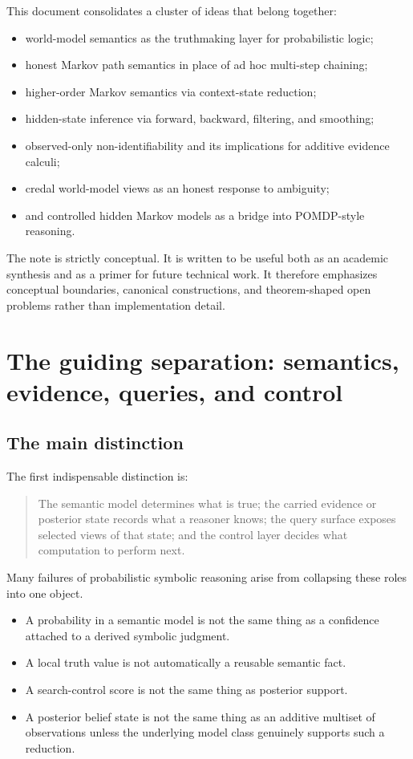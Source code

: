 \documentclass[11pt]{article}
\begin{document}
This document consolidates a cluster of ideas that belong together:
\begin{itemize}
  \item world-model semantics as the truthmaking layer for probabilistic logic;
  \item honest Markov path semantics in place of ad hoc multi-step chaining;
  \item higher-order Markov semantics via context-state reduction;
  \item hidden-state inference via forward, backward, filtering, and smoothing;
  \item observed-only non-identifiability and its implications for additive
        evidence calculi;
  \item credal world-model views as an honest response to ambiguity;
  \item and controlled hidden Markov models as a bridge into POMDP-style
        reasoning.
\end{itemize}

The note is strictly conceptual.  It is written to be useful both as an
academic synthesis and as a primer for future technical work.  It therefore
emphasizes conceptual boundaries, canonical constructions, and theorem-shaped
open problems rather than implementation detail.

\section{The guiding separation: semantics, evidence, queries, and control}

\subsection{The main distinction}

The first indispensable distinction is:
\begin{quote}
The semantic model determines what is true; the carried evidence or posterior
state records what a reasoner knows; the query surface exposes selected views of
that state; and the control layer decides what computation to perform next.
\end{quote}

Many failures of probabilistic symbolic reasoning arise from collapsing these
roles into one object.

\begin{itemize}
  \item A probability in a semantic model is not the same thing as a confidence
        attached to a derived symbolic judgment.
  \item A local truth value is not automatically a reusable semantic fact.
  \item A search-control score is not the same thing as posterior support.
  \item A posterior belief state is not the same thing as an additive multiset
        of observations unless the underlying model class genuinely supports
        such a reduction.
\end{itemize}
\end{document}
